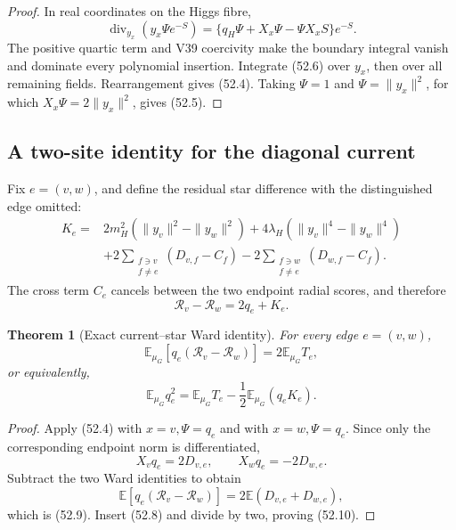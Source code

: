 \documentclass[11pt]{article}
\newtheorem{theorem}{Theorem}[section]
\theoremstyle{remark}
\begin{document}
\begin{proof}
In real coordinates on the Higgs fibre,
\[
 \operatorname{div}_{y_x}(y_x\Psi e^{-S})
 =
 \{q_H\Psi+X_x\Psi-\Psi X_xS\}e^{-S}.             \tag{52.6}
\]
The positive quartic term and V39 coercivity make the boundary
integral vanish and dominate every polynomial insertion.  Integrate
(52.6) over \(y_x\), then over all remaining fields.  Rearrangement
gives (52.4).  Taking \(\Psi=1\) and
\(\Psi=\|y_x\|^2\), for which
\(X_x\Psi=2\|y_x\|^2\), gives (52.5).
\end{proof}

\subsection{A two-site identity for the diagonal current}

Fix \(e=(v,w)\), and define the residual star difference with the
distinguished edge omitted:
\[
\begin{aligned}
 K_e={}&
 2m_H^2(\|y_v\|^2-\|y_w\|^2)
 +4\lambda_H(\|y_v\|^4-\|y_w\|^4)\\
 &+2\sum_{\substack{f\ni v\\f\ne e}}(D_{v,f}-C_f)
 -2\sum_{\substack{f\ni w\\f\ne e}}(D_{w,f}-C_f).               \tag{52.7}
\end{aligned}
\]
The cross term \(C_e\) cancels between the two endpoint radial scores,
and therefore
\[
 \mathscr R_v-\mathscr R_w=2q_e+K_e.              \tag{52.8}
\]

\begin{theorem}[Exact current--star Ward identity]
\label{thm:v17v52-edge}
For every edge \(e=(v,w)\),
\[
\boxed{
 \mathbb E_{\mu_G}
 [q_e(\mathscr R_v-\mathscr R_w)]
 =
 2\mathbb E_{\mu_G}T_e,}                          \tag{52.9}
\]
or equivalently,
\[
\boxed{
 \mathbb E_{\mu_G}q_e^2
 =
 \mathbb E_{\mu_G}T_e
 -\frac12\mathbb E_{\mu_G}(q_eK_e).}              \tag{52.10}
\]
\end{theorem}

\begin{proof}
Apply (52.4) with \(x=v,\Psi=q_e\) and with
\(x=w,\Psi=q_e\).  Since only the corresponding endpoint norm is
differentiated,
\[
 X_vq_e=2D_{v,e},\qquad X_wq_e=-2D_{w,e}.         \tag{52.11}
\]
Subtract the two Ward identities to obtain
\[
 \mathbb E[q_e(\mathscr R_v-\mathscr R_w)]
 =
 2\mathbb E(D_{v,e}+D_{w,e}),
\]
which is (52.9).  Insert (52.8) and divide by two, proving (52.10).
\end{proof}
\end{document}
